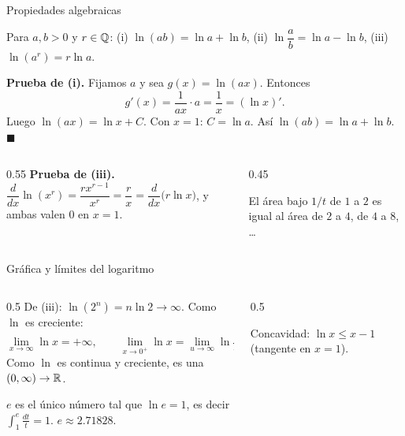 \documentclass[10pt,aspectratio=169]{beamer}
\begin{document}
\begin{frame}{Propiedades algebraicas}
  \begin{teorema}
    Para $a,b>0$ y $r\in\mathbb{Q}$:
    \quad (i) $\ln(ab)=\ln a+\ln b$, \quad (ii) $\ln\dfrac ab=\ln a-\ln b$, \quad (iii) $\ln(a^r)=r\ln a$.
  \end{teorema}
  \textbf{Prueba de (i).} Fijamos $a$ y sea $g(x)=\ln(ax)$. Entonces
  \[ g'(x)=\frac{1}{ax}\cdot a=\frac1x=(\ln x)'. \]
  Luego $\ln(ax)=\ln x+C$. Con $x=1$: $C=\ln a$. \quad Así $\ln(ab)=\ln a+\ln b$. $\blacksquare$
  \begin{columns}
    \begin{column}{0.55\textwidth}
      \textbf{Prueba de (iii).} $\dfrac{d}{dx}\ln(x^r)=\dfrac{rx^{r-1}}{x^r}=\dfrac rx=\dfrac{d}{dx}\big(r\ln x\big)$,
      y ambas valen $0$ en $x=1$.
    \end{column}
    \begin{column}{0.45\textwidth}
      \begin{observacion}[interpretación]
        El área bajo $1/t$ de $1$ a $2$ es igual al área de $2$ a $4$, de $4$ a $8$, \dots
      \end{observacion}
    \end{column}
  \end{columns}
\end{frame}

\begin{frame}{Gráfica y límites del logaritmo}
  \begin{columns}
    \begin{column}{0.5\textwidth}
      De (iii): $\ln(2^n)=n\ln2\to\infty$. Como $\ln$ es creciente:
      \[ \lim_{x\to\infty}\ln x=+\infty,\qquad \lim_{x\to0^+}\ln x=\lim_{u\to\infty}\ln\frac1u=-\infty. \]
      Como $\ln$ es continua y creciente, es una  $(0,\infty)\to\mathbb{R}$.
      \begin{definicion}[el número $e$]
        $e$ es el único número tal que $\ln e=1$, es decir $\displaystyle\int_1^e\frac{dt}{t}=1$.
        \quad $e\approx2.71828$.
      \end{definicion}
    \end{column}
    \begin{column}{0.5\textwidth}
      \centering

      \small Concavidad: $\ln x\le x-1$ (tangente en $x=1$).
    \end{column}
  \end{columns}
\end{frame}
\end{document}
